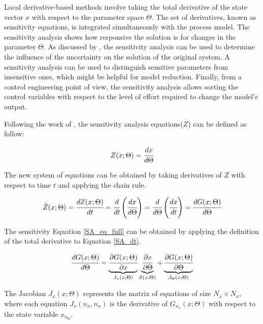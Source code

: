 \documentclass[../Article_Sensitivity_Analsysis.tex]{subfiles}
\begin{document}
	
	Local derivative-based methods involve taking the total derivative of the state vector $x$ with respect to the parameter space $\Theta$. The set of derivatives, known as sensitivity equations, is integrated simultaneously with the process model. The sensitivity analysis shows how responsive the solution is for changes in the parameter $\Theta$. As discussed by \citet{Dickinson1976}, the sensitivity analysis can be used to determine the influence of the uncertainty on the solution of the original system. A sensitivity analysis can be used to distinguish sensitive parameters from insensitive ones, which might be helpful for model reduction. Finally, from a control engineering point of view, the sensitivity analysis allows sorting the control variables with respect to the level of effort required to change the model's output.
	
	Following the work of \citet{Maly1996}, the sensitivity analysis equations(${\dot{Z}}$) can be defined as follow:
	
	{\footnotesize
		\begin{equation}
			\label{SA_def}
			Z(x;\Theta) = \cfrac{dx}{d\Theta}
	   \end{equation} }
	
	The new system of equations can be obtained by taking derivatives of $Z$ with respect to time $t$ and applying the chain rule.
	
	{\footnotesize
		\begin{equation} \label{SA_dt} 
			{\dot{Z}}(x;\Theta)  = \cfrac{dZ(x;\Theta)}{d t} = \cfrac{d}{d t} \left( \cfrac{dx}{d\Theta} \right) = \cfrac{d }{d\Theta} \left( \cfrac{dx}{d t} \right) = \cfrac{d {G}(x;\Theta)}{d\Theta} 
	\end{equation} }
	
	The sensitivity Equation \ref{SA_eq_full} can be obtained by applying the definition of the total derivative to Equation \ref{SA_dt}.
	
	{\footnotesize
		\begin{equation} \label{SA_eq_full}
			\cfrac{dG(x;\Theta)}{d\Theta} = \underbrace{ \cfrac{\partial {G}(x;\Theta)}{\partial x} }_{{J_x}(x;\Theta)} \underbrace{\cfrac{\partial x}{\partial \Theta} }_{S(x;\Theta)} + \underbrace{ \cfrac{\partial {G}(x;\Theta)}{\partial \Theta} }_{{J_\Theta}(x;\Theta)}
	  \end{equation} }
	
	The Jacobian ${J_x}(x;\Theta)$ represents the matrix of equations of size $N_x \times N_x$, where each equation ${J_x}(n_x,n_x)$ is the derivative of ${G}_{n_x}(x;\Theta)$ with respect to the state variable $x_{n_\Theta}$.
	
\end{document}
